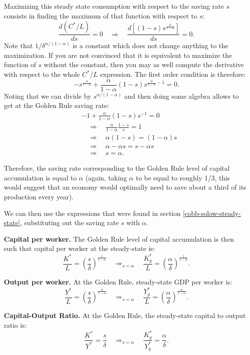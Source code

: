 \documentclass[]{book}
\begin{document}
Maximizing this steady state consumption with respect to the saving rate
\(s\) consists in finding the maximum of that function with respect to
\(s\):
\[\frac{d\left(C^{*}/L\right)}{ds}=0\quad\Rightarrow\quad\frac{d\left[(1-s)s^{\frac{\alpha}{1-\alpha}}\right]}{ds}=0.\]
Note that \(1/\delta^{\alpha/(1-\alpha)}\) is a constant which does not
change anything to the maximization. If you are not convinced that it is
equivalent to maximize the function of \(s\) without the constant, then
you may as well compute the derivative with respect to the whole
\(C^{*}/L\) expression. The first order condition is therefore:
\[-s^{\frac{\alpha}{1-\alpha}}+\frac{\alpha}{1-\alpha}(1-s)s^{\frac{\alpha}{1-\alpha}-1}=0.\]
Noting that we can divide by \(s^{\alpha/(1-\alpha)}\) and then doing
some algebra allows to get at the Golden Rule saving rate: \[
\begin{aligned}
&-1 + \frac{\alpha}{1-\alpha}(1-s)s^{-1}=0\\
&\quad \Rightarrow\quad\frac{\alpha}{1-\alpha}\frac{1-s}{s}=1\\
&\quad \Rightarrow \quad \alpha(1-s)=(1-\alpha)s\\
&\quad \Rightarrow\quad\alpha-\alpha s=s-\alpha s\\
&\quad\Rightarrow\quad\boxed{s=\alpha}.
\end{aligned}
\]

Therefore, the saving rate corresponding to the Golden Rule level of
capital accumulation is equal to \(\alpha\) (again, taking \(\alpha\) to
be equal to roughly 1/3, this would suggest that an economy would
optimally need to save about a third of its production every year).

We can then use the expressions that were found in section
\ref{cobb-solow-steady-state}, substituting out the saving rate \(s\)
with \(\alpha\).

\textbf{Capital per worker.} The Golden Rule level of capital
accumulation is then such that capital per worker at the steady-state
is:
\[\frac{K^{*}}{L}=\left(\frac{s}{\delta}\right)^{\frac{1}{1-\alpha}}\quad\Rightarrow_{s=\alpha}\quad \boxed{\frac{K^{*}_g}{L}=\left(\frac{\alpha}{\delta}\right)^{\frac{1}{1-\alpha}}}.\]

\textbf{Output per worker.} At the Golden Rule, steady-state GDP per
worker is:
\[\frac{Y^{*}}{L}=\left(\frac{s}{\delta}\right)^{\frac{\alpha}{1-\alpha}}\quad\Rightarrow_{s=\alpha}\quad \boxed{\frac{Y^{*}_g}{L}=\left(\frac{\alpha}{\delta}\right)^{\frac{\alpha}{1-\alpha}}}.\]

\textbf{Capital-Output Ratio.} At the Golden Rule, the steady-state
capital to output ratio is:
\[\frac{K^{*}}{Y^{*}} = \frac{s}{\delta} \quad \Rightarrow_{s=\alpha} \quad \boxed{\frac{K^{*}_g}{Y^{*}_g} = \frac{\alpha}{\delta}}.\]
\end{document}
